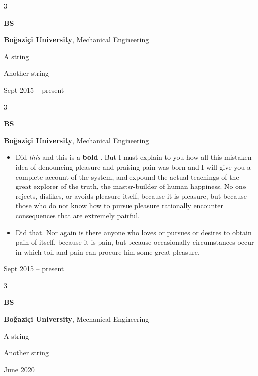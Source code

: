 \documentclass[10pt, letterpaper]{article}
\newenvironment{summary}{
    \begin{description}[
        topsep=0.10 cm,
        parsep=0.10 cm,
        partopsep=0pt,
        itemsep=0pt,
        leftmargin=0.4 cm + 10pt
    ]
}{
    \end{description}
} %
\newenvironment{highlights}{
    \begin{itemize}[
        topsep=0.10 cm,
        parsep=0.10 cm,
        partopsep=0pt,
        itemsep=0pt,
        leftmargin=0.4 cm + 10pt
    ]
}{
    \end{itemize}
} %
\newenvironment{threecolentry}[3][]{
    \onecolentry
    \def\thirdColumn{#3}
    \setcolumnwidth{1 cm, \fill, 4.5 cm}
    \begin{paracol}{3}
    {\raggedright #2} \switchcolumn
}{
    \switchcolumn \raggedleft \thirdColumn
    \end{paracol}
    \endonecolentry
} %
\let\hrefWithoutArrow\href
\renewcommand{\href}[2]{\hrefWithoutArrow{#1}{\ifthenelse{\equal{#2}{}}{ }{#2 }\raisebox{.15ex}{\footnotesize \faExternalLink*}}}
\begin{document}
        \vspace{0.2 cm}

        \begin{threecolentry}{\textbf{BS}}{
            Sept 2015 – present
        }
            \textbf{Boğaziçi University}, Mechanical Engineering
            \begin{summary}
                \item A string
                \item Another string
            \end{summary}
        \end{threecolentry}

        \vspace{0.2 cm}

        \begin{threecolentry}{\textbf{BS}}{
            Sept 2015 – present
        }
            \textbf{Boğaziçi University}, Mechanical Engineering
            \begin{highlights}
                \item Did \textit{this} and this is a \textbf{bold} \href{https://example.com}{link}. But I must explain to you how all this mistaken idea of denouncing pleasure and praising pain was born and I will give you a complete account of the system, and expound the actual teachings of the great explorer of the truth, the master-builder of human happiness. No one rejects, dislikes, or avoids pleasure itself, because it is pleasure, but because those who do not know how to pursue pleasure rationally encounter consequences that are extremely painful.
                \item Did that. Nor again is there anyone who loves or pursues or desires to obtain pain of itself, because it is pain, but because occasionally circumstances occur in which toil and pain can procure him some great pleasure.
            \end{highlights}
        \end{threecolentry}

        \vspace{0.2 cm}

        \begin{threecolentry}{\textbf{BS}}{
            June 2020
        }
            \textbf{Boğaziçi University}, Mechanical Engineering
            \begin{summary}
                \item A string
                \item Another string
            \end{summary}
        \end{threecolentry}
\end{document}
